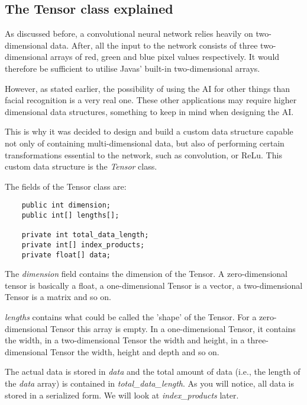 \documentclass[12pt, titlepage]{article}
\begin{document}
    \subsection{The Tensor class explained} \label{Tensor}
    As discussed before, a convolutional neural network relies heavily on two-dimensional data. After, all the input to the network consists of three two-dimensional arrays of red, green and blue pixel values respectively. It would therefore be sufficient to utilise Javas' built-in two-dimensional arrays.
    
    However, as stated earlier, the possibility of using the AI for other things than facial recognition is a very real one. These other applications may require higher dimensional data structures, something to keep in mind when designing the AI.
    
    This is why it was decided to design and build a custom data structure capable not only of containing multi-dimensional data, but also of performing certain transformations essential to the network, such as convolution, or ReLu. This custom data structure is the \textit{Tensor} class.
    
    The fields of the Tensor class are:
    \begin{lstlisting}
    public int dimension;
    public int[] lengths[];
    
    private int total_data_length;
    private int[] index_products;
    private float[] data;
    \end{lstlisting}
    The \textit{dimension} field contains the dimension of the Tensor. A zero-dimensional tensor is basically a float, a one-dimensional Tensor is a vector, a two-dimensional Tensor is a matrix and so on.
    
    \textit{lengths} contains what could be called the 'shape' of the Tensor. For a zero-dimensional Tensor this array is empty. In a one-dimensional Tensor, it contains the width, in a two-dimensional Tensor the width and height, in a three-dimensional Tensor the width, height and depth and so on.
    
    The actual data is stored in \textit{data} and the total amount of data (i.e., the length of the \textit{data} array) is contained in \textit{total\_data\_length}. As you will notice, all data is stored in a serialized form. We will look at \textit{index\_products} later.
    
\end{document}
